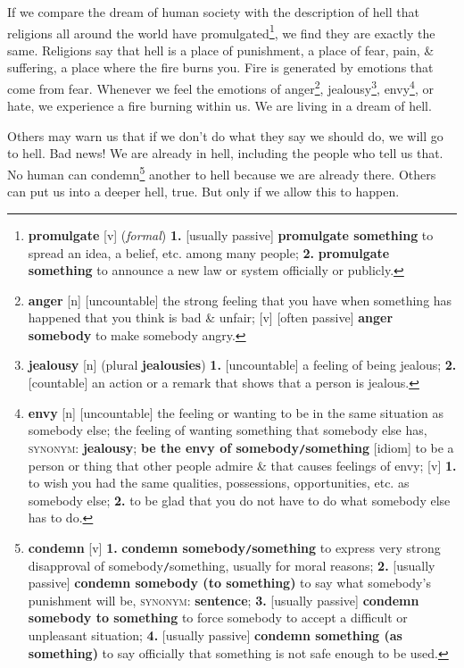 \documentclass[oneside]{book}
\numberwithin{equation}{section}
\begin{document}
If we compare the dream of human society with the description of hell that religions all around the world have promulgated\footnote{\textbf{promulgate} [v] (\textit{formal}) \textbf{1.} [usually passive] \textbf{promulgate something} to spread an idea, a belief, etc. among many people; \textbf{2.} \textbf{promulgate something} to announce a new law or system officially or publicly.}, we find they are exactly the same. Religions say that hell is a place of punishment, a place of fear, pain, \& suffering, a place where the fire burns you. Fire is generated by emotions that come from fear. Whenever we feel the emotions of anger\footnote{\textbf{anger} [n] [uncountable] the strong feeling that you have when something has happened that you think is bad \& unfair; [v] [often passive] \textbf{anger somebody} to make somebody angry.}, jealousy\footnote{\textbf{jealousy} [n] (plural \textbf{jealousies}) \textbf{1.} [uncountable] a feeling of being jealous; \textbf{2.} [countable] an action or a remark that shows that a person is jealous.}, envy\footnote{\textbf{envy} [n] [uncountable] the feeling or wanting to be in the same situation as somebody else; the feeling of wanting something that somebody else has, \textsc{synonym}: \textbf{jealousy}; \textbf{be the envy of somebody\texttt{/}something} [idiom] to be a person or thing that other people admire \& that causes feelings of envy; [v] \textbf{1.} to wish you had the same qualities, possessions, opportunities, etc. as somebody else; \textbf{2.} to be glad that you do not have to do what somebody else has to do.}, or hate, we experience a fire burning within us. We are living in a dream of hell.

 Others may warn us that if we don't do what they say we should do, we will go to hell. Bad news! We are already in hell, including the people who tell us that. No human can condemn\footnote{\textbf{condemn} [v] \textbf{1.} \textbf{condemn somebody\texttt{/}something} to express very strong disapproval of somebody\texttt{/}something, usually for moral reasons; \textbf{2.} [usually passive] \textbf{condemn somebody (to something)} to say what somebody's punishment will be, \textsc{synonym}: \textbf{sentence}; \textbf{3.} [usually passive] \textbf{condemn somebody to something} to force somebody to accept a difficult or unpleasant situation; \textbf{4.} [usually passive] \textbf{condemn something (as something)} to say officially that something is not safe enough to be used.} another to hell because we are already there. Others can put us into a deeper hell, true. But only if we allow this to happen.
\end{document}
